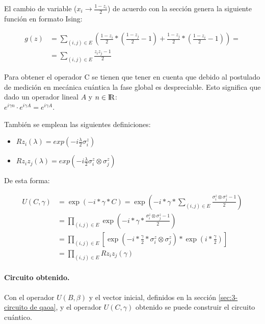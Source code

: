 El cambio de variable ($x_i \rightarrow \frac{1 - z_i}{2}$) de acuerdo con la sección  %
genera la siguiente función en formato Ising:

\begin{align*}
  g(z) &= \sum_{(i, j) \in E} (\frac{1 - z_i}{2} * (\frac{1 - z_j}{2} - 1) + \frac{1 - z_j}{2} * (\frac{1 - z_i}{2} - 1)) = \\
       &= \sum_{(i, j) \in E} \frac{z_iz_j - 1}{2}
\end{align*}

Para obtener el operador C se tienen que tener en cuenta que debido al postulado de medición en mecánica cuántica \cite{Nielsen_Chuang_2010} la fase global es despreciable. Esto significa que dado un operador lineal $A$ y $n \in {\rm I\!R}$: \\
\(e^{i \gamma n} \cdot e^{i \gamma A} = e^{i \gamma A}\).

También se emplean las siguientes definiciones:  %
\begin{itemize}
\item \( Rz_i(\lambda) = exp(-i\frac{\lambda}{2}\sigma_i^z) \)
\item \( Rz_iz_j(\lambda) = exp(-i\frac{\lambda}{2}\sigma_i^z \otimes \sigma_j^z) \)
\end{itemize}

De esta forma:

\begin{align*}
  U(C, \gamma) &=  \exp(-i*\gamma*C) = \exp(-i*\gamma* \sum_{(i, j) \in E} \frac{\sigma_i^z \otimes \sigma_j^z - 1}{2}) \\
          &= \prod_{(i, j) \in E} \exp(-i*\gamma* \frac{\sigma_i^z \otimes \sigma_j^z - 1}{2}) \\
          &= \prod_{(i, j) \in E} [ \exp(-i*\frac{\gamma}{2}* \sigma_i^z \otimes \sigma_j^z) * \exp(i*\frac{\gamma}{2}) ] \\
          &= \prod_{(i, j) \in E} Rz_iz_j(\gamma)
\end{align*}

\paragraph{Circuito obtenido.}
Con el operador \(U(B, \beta)\) y el vector inicial, definidos en la sección \ref{sec:3-circuito de qaoa}, y el operador \(U(C, \gamma)\) obtenido se puede construir el circuito cuántico.

